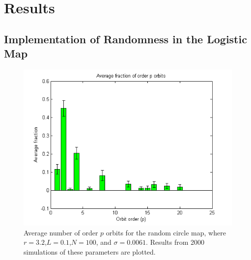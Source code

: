 \chapter{Results}
\section{Implementation of Randomness in the Logistic Map}
\begin{figure}[!h]
\caption[Average number of order $p$ orbits for the random circle
map]{Average number of order $p$ orbits for the random circle
map, where $r =3.2$,$L=0.1$,$N=100$, and $\sigma = 0.0061$. Results from 2000
simulations of these parameters are plotted.}
	\begin{center}
          \includegraphics[scale=0.7]{figs/rlog_hist_r32_L01.png}
	\end{center}
\end{figure}

